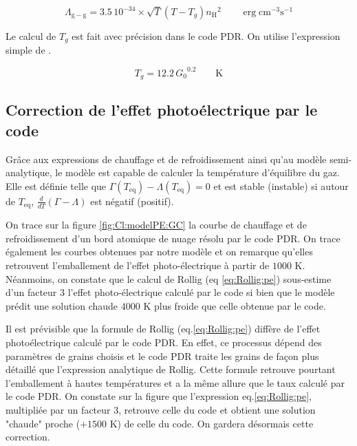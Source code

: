 \begin{equation}
    \Lambda_{\mathrm{g}-\mathrm{g}} = 3.5\,10^{-34}\times \sqrt{T}(T - T_g) {n_\mathrm{H}}^2 \qquad \operatorname{erg} \mathrm{cm}^{-3} \mathrm{s}^{-1}
\end{equation}

Le calcul de $T_g$ est fait avec précision dans le code PDR. On utilise l'expression simple de \cite{Hollenbach1991}. 

\begin{equation}
    T_g = 12.2 \,{G_0}^{0.2} \qquad \mathrm{K}
\end{equation}



\subsection{Correction de l'effet photoélectrique par le code}

Grâce aux expressions de chauffage et de refroidissement ainsi qu'au modèle semi-analytique, le modèle est capable de calculer la température d'équilibre du gaz. Elle est définie telle que $\Gamma(T_{\mathrm{eq}}) - \Lambda(T_{\mathrm{eq}}) = 0$ et est stable (instable) si autour de $T_{\mathrm{eq}}$, $\frac{d}{dT}(\Gamma - \Lambda)$ est négatif (positif). \newline 

On trace sur la figure \ref{fig:Cl:modelPE:GC} la courbe de chauffage et de refroidissement d'un bord atomique de nuage résolu par le code PDR. On trace également les courbes obtenues par notre modèle et on remarque qu'elles retrouvent l'emballement de l'effet photo-électrique à partir de $1000$ K. Néanmoins, on constate que le calcul de Rollig (eq \ref{eq:Rollig:pe}) sous-estime d'un facteur 3 l'effet photo-électrique calculé par le code si bien que le modèle prédit une solution \og chaude \fg{} $4000$ K plus froide que celle obtenue par le code. \newline 

Il est prévisible que la formule de Rollig (eq.\ref{eq:Rollig:pe}) diffère de l'effet photoélectrique calculé par le code PDR. En effet, ce processus dépend des paramètres de grains choisis et le code PDR traite les grains de façon plus détaillé que l'expression analytique de Rollig. Cette formule retrouve pourtant l'emballement à hautes températures et a la même allure que le taux calculé par le code PDR. On constate sur la figure \label{fig:Cl:modelPE:GC3} que l'expression eq.\ref{eq:Rollig:pe}, multipliée par un facteur 3, retrouve celle du code et obtient une solution "chaude" proche ($+1500$ K) de celle du code. On gardera désormais cette correction. 



